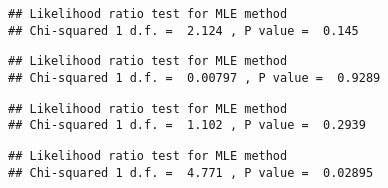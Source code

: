 \begin{knitrout}
\begin{kframe}
\begin{alltt}
\hlstd{(}\hlstd{(}\hlopt{~}\hlstd{(}\hlopt{~}\hlstd{,}
\end{alltt}
\begin{verbatim}
## Likelihood ratio test for MLE method 
## Chi-squared 1 d.f. =  2.124 , P value =  0.145
\end{verbatim}
\begin{alltt}
\hlstd{(}\hlstd{(}\hlopt{~}\hlstd{(}\hlopt{~}\hlstd{,}
\end{alltt}
\begin{verbatim}
## Likelihood ratio test for MLE method 
## Chi-squared 1 d.f. =  0.00797 , P value =  0.9289
\end{verbatim}
\begin{alltt}
\hlstd{(}\hlstd{(}\hlopt{~}\hlstd{(}\hlopt{~}\hlstd{,}
\end{alltt}
\begin{verbatim}
## Likelihood ratio test for MLE method 
## Chi-squared 1 d.f. =  1.102 , P value =  0.2939
\end{verbatim}
\begin{alltt}
\hlstd{(}\hlstd{(}\hlopt{~}\hlstd{(}\hlopt{~}\hlstd{,}
\end{alltt}
\begin{verbatim}
## Likelihood ratio test for MLE method 
## Chi-squared 1 d.f. =  4.771 , P value =  0.02895
\end{verbatim}
\end{kframe}
\end{knitrout}
